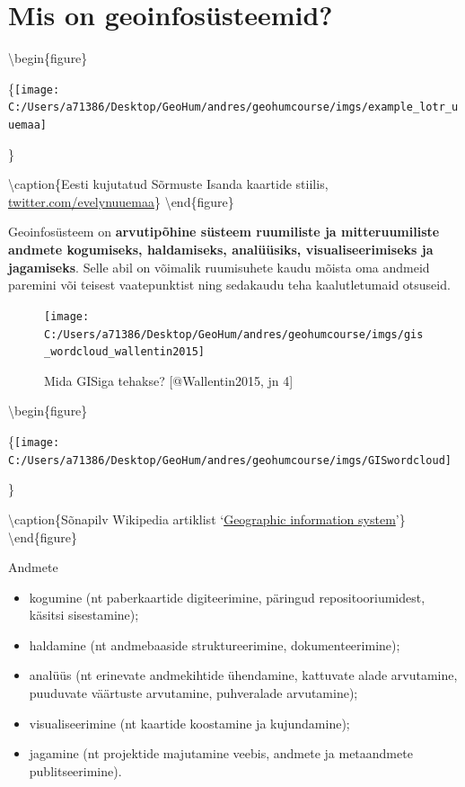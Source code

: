 \documentclass[
]{book}
\providecommand{\tightlist}{%
  \setlength{\itemsep}{0pt}\setlength{\parskip}{0pt}}
\begin{document}
\hypertarget{mis-on-geoinfosuxfcsteemid}{%
\section{Mis on geoinfosüsteemid?}\label{mis-on-geoinfosuxfcsteemid}}

\textbackslash begin\{figure\}

\{\centering \texttt{[image: C:/Users/a71386/Desktop/GeoHum/andres/geohumcourse/imgs/example\_lotr\_uuemaa]}

\}

\textbackslash caption\{Eesti kujutatud Sõrmuste Isanda kaartide stiilis, \href{https://twitter.com/evelynuuemaa/status/1291261715095662592?s=07\&fbclid=IwAR1q6bpp4c7UNOTYph2YngZ7DrlBzrftR1gX2upWtoVNxLNzdFsgXZv_sVQ}{twitter.com/evelynuuemaa}\}\label{fig:lotr-map}
\textbackslash end\{figure\}

Geoinfosüsteem on \textbf{arvutipõhine süsteem ruumiliste ja mitteruumiliste andmete kogumiseks, haldamiseks, analüüsiks, visualiseerimiseks ja jagamiseks}. Selle abil on võimalik ruumisuhete kaudu mõista oma andmeid paremini või teisest vaatepunktist ning sedakaudu teha kaalutletumaid otsuseid.

\begin{figure}

{\centering \texttt{[image: C:/Users/a71386/Desktop/GeoHum/andres/geohumcourse/imgs/gis\_wordcloud\_wallentin2015]} 

}

\caption{Mida GISiga tehakse? [@Wallentin2015, jn 4]}\label{fig:gis-wordcloud}
\end{figure}

\textbackslash begin\{figure\}

\{\centering \texttt{[image: C:/Users/a71386/Desktop/GeoHum/andres/geohumcourse/imgs/GISwordcloud]}

\}

\textbackslash caption\{Sõnapilv Wikipedia artiklist `\href{https://en.wikipedia.org/wiki/Geographic_information_system}{Geographic information system}'\}\label{fig:gis-wordcloud2}
\textbackslash end\{figure\}

Andmete

\begin{itemize}
\tightlist
\item
  kogumine (nt paberkaartide digiteerimine, päringud repositooriumidest, käsitsi sisestamine);\\
\item
  haldamine (nt andmebaaside struktureerimine, dokumenteerimine);\\
\item
  analüüs (nt erinevate andmekihtide ühendamine, kattuvate alade arvutamine, puuduvate väärtuste arvutamine, puhveralade arvutamine);
\item
  visualiseerimine (nt kaartide koostamine ja kujundamine);
\item
  jagamine (nt projektide majutamine veebis, andmete ja metaandmete publitseerimine).
\end{itemize}
\end{document}
